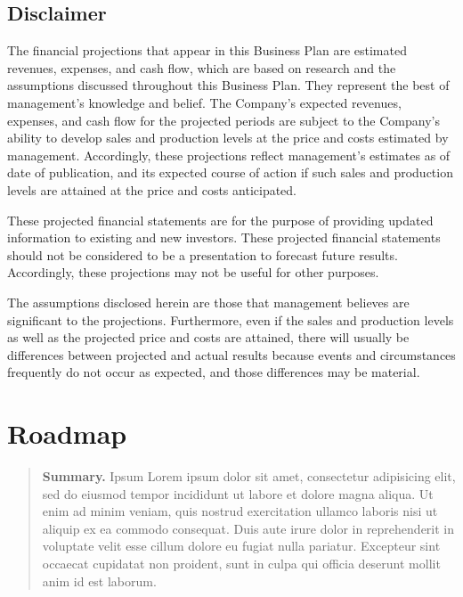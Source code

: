 \documentclass[9pt,]{book}
\begin{document}
\hypertarget{disclaimer}{%
\section{Disclaimer}\label{disclaimer}}

The financial projections that appear in this Business Plan are
estimated revenues, expenses, and cash flow, which are based on research
and the assumptions discussed throughout this Business Plan. They
represent the best of management's knowledge and belief. The Company's
expected revenues, expenses, and cash flow for the projected periods are
subject to the Company's ability to develop sales and production levels
at the price and costs estimated by management. Accordingly, these
projections reflect management's estimates as of date of publication,
and its expected course of action if such sales and production levels
are attained at the price and costs anticipated.

These projected financial statements are for the purpose of providing
updated information to existing and new investors. These projected
financial statements should not be considered to be a presentation to
forecast future results. Accordingly, these projections may not be
useful for other purposes.

The assumptions disclosed herein are those that management believes are
significant to the projections. Furthermore, even if the sales and
production levels as well as the projected price and costs are attained,
there will usually be differences between projected and actual results
because events and circumstances frequently do not occur as expected,
and those differences may be material.

\hypertarget{roadmap}{%
\chapter{Roadmap}\label{roadmap}}

\begin{quote}
\textbf{Summary.} Ipsum Lorem ipsum dolor sit amet, consectetur
adipisicing elit, sed do eiusmod tempor incididunt ut labore et dolore
magna aliqua. Ut enim ad minim veniam, quis nostrud exercitation ullamco
laboris nisi ut aliquip ex ea commodo consequat. Duis aute irure dolor
in reprehenderit in voluptate velit esse cillum dolore eu fugiat nulla
pariatur. Excepteur sint occaecat cupidatat non proident, sunt in culpa
qui officia deserunt mollit anim id est laborum.
\end{quote}
\end{document}
